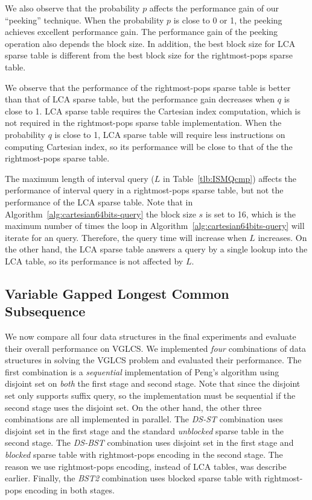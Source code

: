 

We also observe that the probability $p$ affects the performance gain of
our ``peeking'' technique.  When the probability $p$ is close to 0 or 1,
the peeking achieves excellent performance gain.  The performance gain
of the peeking operation also depends the block size.  In addition, the
best block size for LCA sparse table is different from the best block
size for the rightmost-pops sparse table.

We observe that the performance of the rightmost-pops sparse table is
better than that of LCA sparse table, but the performance gain decreases
when $q$ is close to 1.  LCA sparse table requires the Cartesian index
computation, which is not required in the rightmost-pops sparse table
implementation.  When the probability $q$ is close to 1, LCA sparse
table will require less instructions on computing Cartesian index, so
its performance will be close to that of the the rightmost-pops sparse
table.

The maximum length of interval query ($L$ in Table~\ref{tlb:ISMQcmp})
affects the performance of interval query in a rightmost-pops sparse
table, but not the performance of the LCA sparse table.  Note that in
Algorithm~\ref{alg:cartesian64bits-query} the block size $s$ is set to
16, which is the maximum number of times the loop in
Algorithm~\ref{alg:cartesian64bits-query} will iterate for an query.
Therefore, the query time will increase when $L$ increases.  On the
other hand, the LCA sparse table answers a query by a single lookup into
the LCA table, so its performance is not affected by $L$.

\subsection{Variable Gapped Longest Common Subsequence}

We now compare all four data structures in the final experiments and
evaluate their overall performance on VGLCS.  We implemented {\em four}
combinations of data structures in solving the VGLCS problem and
evaluated their performance.  The first combination is a {\em
sequential} implementation of Peng's algorithm using disjoint set on
{\em both} the first stage and second stage.  Note that since the
disjoint set only supports suffix query, so the implementation must be
sequential if the second stage uses the disjoint set.  On the other
hand, the other three combinations are all implemented in parallel. The
{\em DS-ST} combination uses disjoint set in the first stage and the
standard {\em unblocked} sparse table in the second stage.  The {\em
DS-BST} combination uses disjoint set in the first stage and {\em
blocked} sparse table with rightmost-pops encoding in the second stage.
The reason we use rightmost-pops encoding, instead of LCA tables, was
describe earlier.  Finally, the {\em BST2} combination uses blocked
sparse table with rightmost-pops encoding in both stages.

